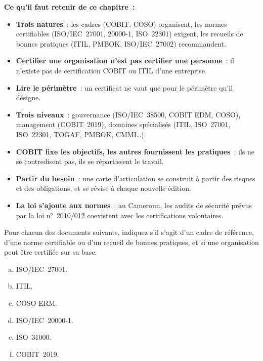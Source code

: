 \begin{boxresume}
\textbf{Ce qu'il faut retenir de ce chapitre~:}
\begin{itemize}
    \item \textbf{Trois natures}~: les cadres (COBIT, COSO) organisent, les
          normes certifiables (ISO/IEC~27001, 20000-1, ISO~22301) exigent,
          les recueils de bonnes pratiques (ITIL, PMBOK, ISO/IEC~27002)
          recommandent.
    \item \textbf{Certifier une organisation n'est pas certifier une
          personne}~: il n'existe pas de certification COBIT ou ITIL d'une
          entreprise.
    \item \textbf{Lire le périmètre}~: un certificat ne vaut que pour le
          périmètre qu'il désigne.
    \item \textbf{Trois niveaux}~: gouvernance (ISO/IEC~38500, COBIT EDM,
          COSO), management (COBIT~2019), domaines spécialisés (ITIL,
          ISO~27001, ISO~22301, TOGAF, PMBOK, CMMI\ldots).
    \item \textbf{COBIT fixe les objectifs, les autres fournissent les
          pratiques}~: ils ne se contredisent pas, ils se répartissent le
          travail.
    \item \textbf{Partir du besoin}~: une carte d'articulation se construit à
          partir des risques et des obligations, et se révise à chaque
          nouvelle édition.
    \item \textbf{La loi s'ajoute aux normes}~: au Cameroun, les audits de
          sécurité prévus par la loi n°~2010/012 coexistent avec les
          certifications volontaires.
\end{itemize}
\end{boxresume}

\bigskip

\begin{boxexo}[title={\ding{45}\quad Exercice~4.1. Quelle nature~? \niveaubase}]
Pour chacun des documents suivants, indiquez s'il s'agit d'un cadre de
référence, d'une norme certifiable ou d'un recueil de bonnes pratiques, et
si une organisation peut être certifiée sur sa base.
\begin{enumerate}[(a)]
    \item ISO/IEC~27001.
    \item ITIL.
    \item COSO ERM.
    \item ISO/IEC~20000-1.
    \item ISO~31000.
    \item COBIT~2019.
\end{enumerate}
\end{boxexo}

